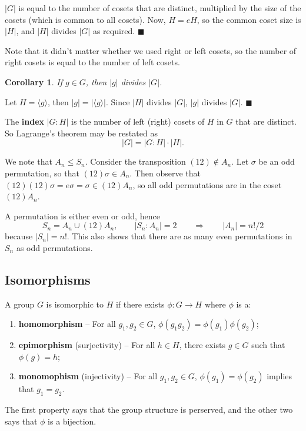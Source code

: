\documentclass[letter-paper]{tufte-book}
\newtheorem{corollary}[theorem]{\color{pastel-blue}Corollary}
\newenvironment{proof}[1][Proof]{\begin{trivlist}
\item[\hskip \labelsep {\bfseries #1}]}{\end{trivlist}}
\newenvironment{example}[1][Example]{\begin{trivlist}
\item[\hskip \labelsep {\bfseries #1}]}{\end{trivlist}}
\newcommand\Def[1]{\textbf{#1}}
\newcommand{\qed}{\hfill$\blacksquare$}
\begin{document}
\begin{proof}[Proof of Lagrange's theorem]
  $|G|$ is equal to the number of cosets that are distinct, multiplied by the 
  size of the cosets (which is common to all cosets). Now, $H=eH$, so the common 
  coset size is $|H|$, and $|H|$ divides $|G|$ as required. \qed
\end{proof}
Note that it didn't matter whether we used right or left cosets, so the number 
of right cosets is equal to the number of left cosets.

\begin{corollary}
  If $g\in G$, then $|g|$ divides $|G|$.
\end{corollary}
\begin{proof}
  Let $H=\langle g\rangle$, then $|g|=|\langle g\rangle|$. Since $|H|$ divides 
  $|G|$, $|g|$ divides $|G|$. \qed
\end{proof}

The \Def{index} $|G:H|$ is the number of left (right) cosets of $H$ in $G$ 
that are distinct. So Lagrange's theorem may be restated as
\begin{equation*}
  |G|=|G:H|\cdot|H|.
\end{equation*}
\begin{example}
  We note that $A_n\leq S_n$. Consider the transposition $(12)\not\in A_n$. Let 
  $\sigma$ be an odd permutation, so that $(12)\sigma\in A_n$. Then observe that 
  $(12)(12)\sigma=e\sigma=\sigma\in(12)A_n$, so all odd permutations are in the 
  coset $(12)A_n$.
  
  A permutation is either even or odd, hence
  \begin{equation*}
    S_n=A_n\cup(12)A_n,\qquad |S_n:A_n|=2\qquad\Rightarrow\qquad |A_n|=n!/2
  \end{equation*}
  because $|S_n|=n!$. This also shows that there are as many even permutations 
  in $S_n$ as odd permutations.
\end{example}


\subsection{Isomorphisms}

A group $G$ is isomorphic to $H$ if there exists $\phi: G\rightarrow H$ where 
$\phi$ is a:
\begin{enumerate}
  \item \Def{homomorphism} -- For all $g_1,g_2\in G$, $\phi(g_1 g_2) 
  = \phi(g_1)\phi(g_2)$;
  \item \Def{epimorphism} (surjectivity) -- For all $h\in H$, there exists 
  $g\in G$ such that $\phi(g)=h$;
  \item \Def{monomophism} (injectivity) -- For all $g_1,g_2\in G$, $\phi
  (g_1)=\phi(g_2)$ implies that $g_1=g_2$.
\end{enumerate}
The first property says that the group structure is perserved, and the other two says that $\phi$ is a bijection.
\end{document}
